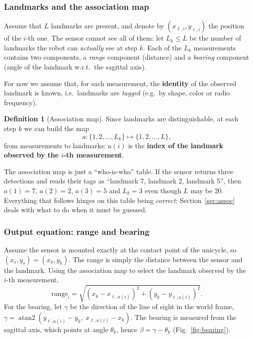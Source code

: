 \documentclass[11pt,a4paper]{article}
\DeclareMathOperator{\atantwo}{atan2}
\theoremstyle{definition}
\newtheorem{definition}{Definition}[section]
\theoremstyle{plain}
\theoremstyle{remark}
\begin{document}
\subsubsection*{Landmarks and the association map}
Assume that $L$ landmarks are present, and denote by $(x_{\ell,i},y_{\ell,i})$ the position of the $i$-th one. The sensor cannot see all of them: let $L_k\le L$ be the number of landmarks the robot can \emph{actually} see at step $k$. Each of the $L_k$ measurements contains two components, a \emph{range} component (distance) and a \emph{bearing} component (angle of the landmark w.r.t.\ the sagittal axis).

For now we assume that, for each measurement, the \textbf{identity} of the observed landmark is known, i.e.\ landmarks are \emph{tagged} (e.g.\ by shape, color or radio frequency).

\begin{definition}[Association map]
\label{def:assoc}
Since landmarks are distinguishable, at each step $k$ we can build the map
\[
a:\{1,2,\dots,L_k\}\longmapsto\{1,2,\dots,L\},
\]
from measurements to landmarks: $a(i)$ is the \textbf{index of the landmark observed by the $i$-th measurement}.
\end{definition}

\begin{intuition}
The association map is just a ``who-is-who'' table. If the sensor returns three detections and reads their tags as ``landmark 7, landmark 2, landmark 5'', then $a(1)=7$, $a(2)=2$, $a(3)=5$ and $L_k=3$ even though $L$ may be $20$. Everything that follows hinges on this table being \emph{correct}: Section~\ref{sec:assoc} deals with what to do when it must be guessed.
\end{intuition}

\subsubsection*{Output equation: range and bearing}
Assume the sensor is mounted exactly at the contact point of the unicycle, so $(x_s,y_s)=(x_k,y_k)$. The range is simply the distance between the sensor and the landmark. Using the association map to select the landmark observed by the $i$-th measurement,
\[
\text{range}_i=\sqrt{(x_k-x_{\ell,a(i)})^2+(y_k-y_{\ell,a(i)})^2}.
\]
For the bearing, let $\gamma$ be the direction of the line of sight in the world frame, $\gamma=\atantwo(y_{\ell,a(i)}-y_k,\;x_{\ell,a(i)}-x_k)$. The bearing is measured from the sagittal axis, which points at angle $\theta_k$, hence $\beta=\gamma-\theta_k$ (Fig.~\ref{fig:bearing}).
\end{document}
